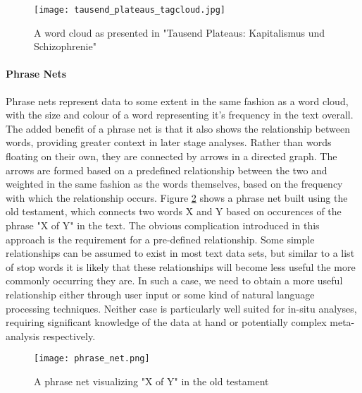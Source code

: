 \begin{figure}
	\centering
	\texttt{[image: tausend\_plateaus\_tagcloud.jpg]}
	\caption{A word cloud as presented in "Tausend Plateaus: Kapitalismus und Schizophrenie" \cite{Deleuze1987}}
	\label{fig:wordcloud}
\end{figure}

\paragraph{Phrase Nets}
Phrase nets \cite{VanHam2009} represent data to some extent in the same fashion as a word cloud, with the size and colour of a word representing it's frequency in the text overall. The added benefit of a phrase net is that it also shows the relationship between words, providing greater context in later stage analyses. Rather than words floating on their own, they are connected by arrows in a directed graph. The arrows are formed based on a predefined relationship between the two and weighted in the same fashion as the words themselves, based on the frequency with which the relationship occurs. Figure \ref{fig:phrasenet} shows a phrase net built using the old testament, which connects two words X and Y based on occurences of the phrase "X of Y" in the text. The obvious complication introduced in this approach is the requirement for a pre-defined relationship. Some simple relationships can be assumed to exist in most text data sets, but similar to a list of stop words it is likely that these relationships will become less useful the more commonly occurring they are. In such a case, we need to obtain a more useful relationship either through user input or some kind of natural language processing techniques. Neither case is particularly well suited for in-situ analyses, requiring significant knowledge of the data at hand or potentially complex meta-analysis respectively. 

\begin{figure}
	\centering
	\texttt{[image: phrase\_net.png]}
	\caption{A phrase net visualizing "X of Y" in the old testament \cite{VanHam2009}}
	\label{fig:phrasenet}
\end{figure}

